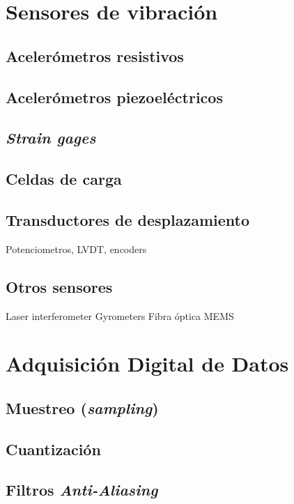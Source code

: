 \section{Sensores de vibración}

\subsection{Acelerómetros resistivos}

\subsection{Acelerómetros piezoeléctricos}

\subsection{\emph{Strain gages}}

\subsection{Celdas de carga}

\subsection{Transductores de desplazamiento}

Potenciometros, LVDT, encoders

\subsection{Otros sensores}

Laser interferometer
Gyrometers
Fibra óptica
MEMS

\section{Adquisición Digital de Datos}

\subsection{Muestreo (\emph{sampling})}

\subsection{Cuantización}

\subsection{Filtros \emph{Anti-Aliasing}}










